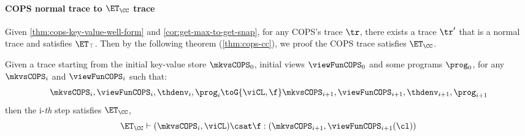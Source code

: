 \paragraph{\bf COPS normal trace to \( \ET_\CC \) trace}
Given \cref{thm:cops-key-value-well-form} and \cref{cor:get-max-to-get-snap}, for any COPS's trace \( \tr \), 
there exists a trace \( \tr' \) that is a normal trace and satisfies \( \ET_\top \).
Then by the following theorem (\cref{thm:cops-cc}), we proof the COPS trace satisfies \( \ET_\CC \).

\begin{theorem}
    \label{thm:cops-cc}
    Given a trace starting from the initial key-value store \( \mkvsCOPS_0 \), initial views \( \viewFunCOPS_0 \) and some programs \( \prog_0 \), for any \( \mkvsCOPS_i \) and \( \viewFunCOPS_i \)  such that: 
    \[
        \mkvsCOPS_i, \viewFunCOPS_i, \thdenv_i, \prog_i \toG{\viCL,\f} \mkvsCOPS_{i+1}, \viewFunCOPS_{i+1}, \thdenv_{i+1}, \prog_{i+1} 
    \]
    then the i-\emph{th} step satisfies \( \ET_\CC \), \ie
    \[
        \ET_\CC \vdash ( \mkvsCOPS_i, \viCL ) \csat \f : (\mkvsCOPS_{i+1},\viewFunCOPS_{i+1}(\cl) )
    \]
\end{theorem}
